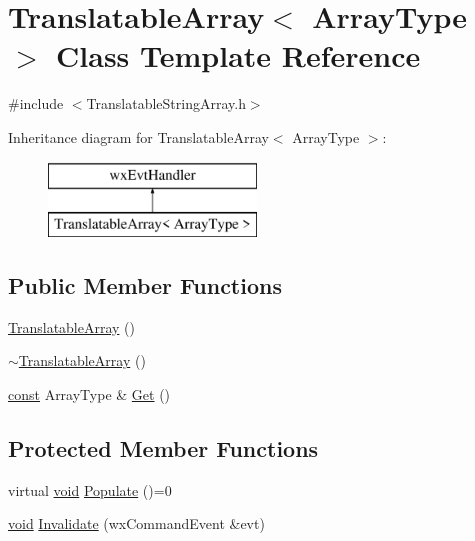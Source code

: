 \hypertarget{class_translatable_array}{}\section{Translatable\+Array$<$ Array\+Type $>$ Class Template Reference}
\label{class_translatable_array}


{\ttfamily \#include $<$Translatable\+String\+Array.\+h$>$}

Inheritance diagram for Translatable\+Array$<$ Array\+Type $>$\+:\begin{figure}[H]
\begin{center}
\leavevmode
\includegraphics[height=2.000000cm]{class_translatable_array}
\end{center}
\end{figure}
\subsection*{Public Member Functions}
\begin{DoxyCompactItemize}
\item 
\hyperlink{class_translatable_array_ada488c39bb288b03d12f13b6f4be24c9}{Translatable\+Array} ()
\item 
\hyperlink{class_translatable_array_a3c3d9a8e0c6c2b15bc4fc0de6573fe0e}{$\sim$\+Translatable\+Array} ()
\item 
\hyperlink{getopt1_8c_a2c212835823e3c54a8ab6d95c652660e}{const} Array\+Type \& \hyperlink{class_translatable_array_aa231a7a3dbb15b8220ced44cb8bd1f44}{Get} ()
\end{DoxyCompactItemize}
\subsection*{Protected Member Functions}
\begin{DoxyCompactItemize}
\item 
virtual \hyperlink{sound_8c_ae35f5844602719cf66324f4de2a658b3}{void} \hyperlink{class_translatable_array_aec2bbe15929a717e60aaf4c4206c3614}{Populate} ()=0
\item 
\hyperlink{sound_8c_ae35f5844602719cf66324f4de2a658b3}{void} \hyperlink{class_translatable_array_ae2fe331c37dc2d5538bf02a4c7dd42b7}{Invalidate} (wx\+Command\+Event \&evt)
\end{DoxyCompactItemize}
